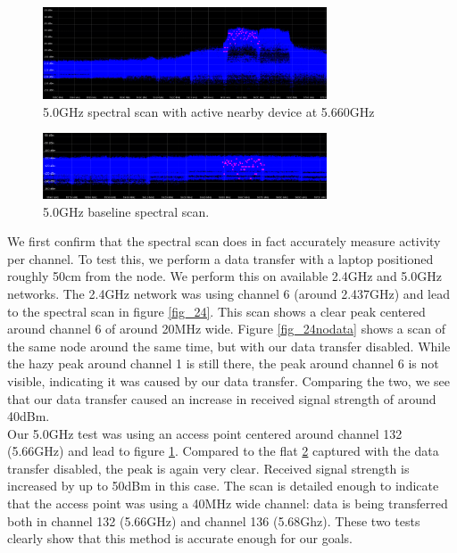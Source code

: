 \documentclass[a4paper, 11pt]{article}
\begin{document}
\begin{figure}[ht]
\centering
\includegraphics[width=0.75\textwidth]{50check.png}
\caption{5.0GHz spectral scan with active nearby device at 5.660GHz}
\label{fig_50}
\end{figure}

\begin{figure}[ht]
\centering
\includegraphics[width=0.75\textwidth]{50check_nodata.png}
\caption{5.0GHz baseline spectral scan.}
\label{fig_50nodata}
\end{figure}
We first confirm that the spectral scan does in fact accurately measure activity per channel. To test this, we perform a data transfer with a laptop positioned roughly 50cm from the node. We perform this on available 2.4GHz and 5.0GHz networks. The 2.4GHz network was using channel 6 (around 2.437GHz) and lead to the spectral scan in figure \ref{fig_24}. This scan shows a clear peak centered around channel 6 of around 20MHz wide. Figure \ref{fig_24nodata} shows a scan of the same node around the same time, but with our data transfer disabled. While the hazy peak around channel 1 is still there, the peak around channel 6 is not visible, indicating it was caused by our data transfer. Comparing the two, we see that our data transfer caused an increase in received signal strength of around 40dBm.\\ Our 5.0GHz test was using an access point centered around channel 132 (5.66GHz) and lead to figure \ref{fig_50}. Compared to the flat \ref{fig_50nodata} captured with the data transfer disabled, the peak is again very clear. Received signal strength is increased by up to 50dBm in this case. The scan is detailed enough to indicate that the access point was using a 40MHz wide channel: data is being transferred both in channel 132 (5.66GHz) and channel 136 (5.68Ghz). These two tests clearly show that this method is accurate enough for our goals.
\end{document}
